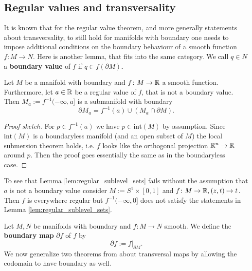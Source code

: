 \subsection{Regular values and transversality}
    It is known that for the regular value theorem, and more generally statements about transversality, to still hold for manifolds with boundary one needs to impose additional conditions on the boundary behaviour of a smooth function $f \colon M \to N$. Here is another lemma, that fits into the same category. We call $q \in N$ a \textbf{boundary value} of $f$ if $q \in f(\partial M)$.

    \begin{lemma}
        \label{lem:regular_sublevel_sets}
        Let $M$ be a manifold with boundary and $f \colon M \to \mathbb{R}$ a smooth function. Furthermore, let $a \in \mathbb{R}$ be a regular value of $f$, that is not a boundary value. Then $M_a := f^{-1}(-\infty,a]$ is a submanifold with boundary 
        \[
            \partial M_a = f^{-1}(a) \cup (M_a \cap \partial M).
        \]
    \end{lemma}
    \begin{proof}[Proof sketch]
        For $p \in f^{-1}(a)$ we have $p \in \mathrm{int}(M)$ by assumption. Since $\mathrm{int}(M)$ is a boundaryless manifold (and an open subset of $M$) the local submersion theorem holds, i.e. $f$ looks like the orthogonal projection $\mathbb{R}^n \to \mathbb{R}$ around $p$. Then the proof goes essentially the same as in the boundaryless case.
    \end{proof}

    \begin{counterexample}
        \label{ex:boundary_values}
        To see that Lemma \ref{lem:regular_sublevel_sets} fails without the assumption that $a$ is not a boundary value consider $M := S^1 \times [0,1]$ and $f \colon M \to \mathbb{R}, (z,t) \mapsto t$. Then $f$ is everywhere regular but $f^{-1}(-\infty,0]$ does not satisfy the statements in Lemma \ref{lem:regular_sublevel_sets}. 
    \end{counterexample}

    Let $M,N$ be manifolds with boundary and $f \colon M\to N$ smooth. We define the \textbf{boundary map} $\partial f$ of $f$ by 
    \[
    \partial f := f|_{\partial M}.
    \]
    We now generalize two theorems from \cite{guillemin2010differential} about transversal maps by allowing the codomain to have boundary as well. 

